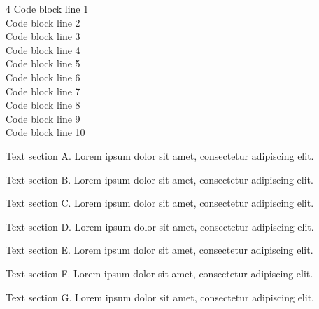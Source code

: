 \documentclass[a4paper,landscape]{article}
\begin{document}
\begin{multicols*}{4}
Code block line 1\\
Code block line 2\\
Code block line 3\\
Code block line 4\\
Code block line 5\\
Code block line 6\\
Code block line 7\\
Code block line 8\\
Code block line 9\\
Code block line 10

Text section A. Lorem ipsum dolor sit amet, consectetur adipiscing elit.

Text section B. Lorem ipsum dolor sit amet, consectetur adipiscing elit.

Text section C. Lorem ipsum dolor sit amet, consectetur adipiscing elit.

Text section D. Lorem ipsum dolor sit amet, consectetur adipiscing elit.

Text section E. Lorem ipsum dolor sit amet, consectetur adipiscing elit.

Text section F. Lorem ipsum dolor sit amet, consectetur adipiscing elit.

Text section G. Lorem ipsum dolor sit amet, consectetur adipiscing elit.
\end{multicols*}
\end{document}
